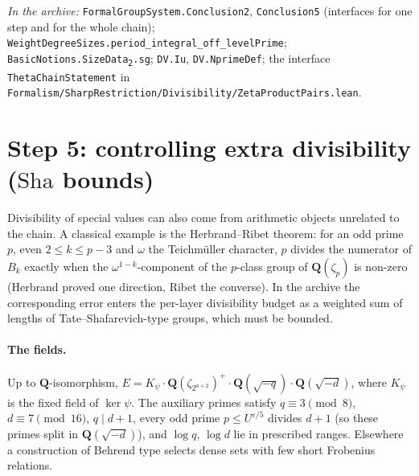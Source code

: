 \documentclass[11pt]{article}
\newcommand{\Lean}[1]{\texttt{\small #1}}
\newcommand{\inarch}[1]{\par{\small\raggedright\noindent\emph{In the archive:} #1\par}}
\newcommand{\Q}{\mathbf{Q}}
\newcommand{\Sha}{\mathrm{Sha}}
\begin{document}
\inarch{\Lean{FormalGroupSystem.Conclusion2}, \Lean{Conclusion5} (interfaces for one step and for the whole chain); \Lean{WeightDegreeSizes.period\_integral\_off\_levelPrime}; \Lean{BasicNotions.SizeData\textsubscript{2}.sg}; \Lean{DV.Iu}, \Lean{DV.NprimeDef}; the interface \Lean{ThetaChainStatement} in \Lean{Formalism/SharpRestriction/Divisibility/ZetaProductPairs.lean}.}

\section{Step 5: controlling extra divisibility ($\Sha$ bounds)}\label{sec:s5}
Divisibility of special values can also come from arithmetic objects unrelated to the chain. A classical example is the Herbrand--Ribet theorem: for an odd prime $p$, even $2\le k\le p-3$ and $\omega$ the Teichm\"uller character, $p$ divides the numerator of $B_k$ exactly when the $\omega^{1-k}$-component of the $p$-class group of $\Q(\zeta_p)$ is non-zero (Herbrand \cite{herbrand} proved one direction, Ribet \cite{ribet} the converse). In the archive the corresponding error enters the per-layer divisibility budget as a weighted sum of lengths of Tate--Shafarevich-type groups, which must be bounded.

\paragraph{The fields.} Up to $\Q$-isomorphism, $E=K_\psi\cdot\Q(\zeta_{2^{a+2}})^+\cdot\Q(\sqrt{-q})\cdot\Q(\sqrt{-d})$, where $K_\psi$ is the fixed field of $\ker\psi$. The auxiliary primes satisfy $q\equiv3\pmod 8$, $d\equiv7\pmod{16}$, $q\mid d+1$, every odd prime $p\le U^{\varepsilon/5}$ divides $d+1$ (so these primes split in $\Q(\sqrt{-d})$), and $\log q$, $\log d$ lie in prescribed ranges. Elsewhere a construction of Behrend type \cite{behrend} selects dense sets with few short Frobenius relations.
\end{document}
